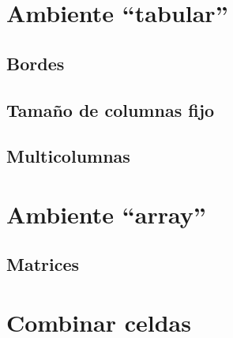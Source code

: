 \documentclass[../notes.tex]{subfiles}
\begin{document}
	\section{Ambiente ``tabular''}
    
        \subsection{Bordes}
        
        \subsection{Tamaño de columnas fijo}
        
        \subsection{Multicolumnas}
        
    \section{Ambiente ``array''}
        
        \subsection{Matrices}
        
    \section{Combinar celdas}
\end{document}
